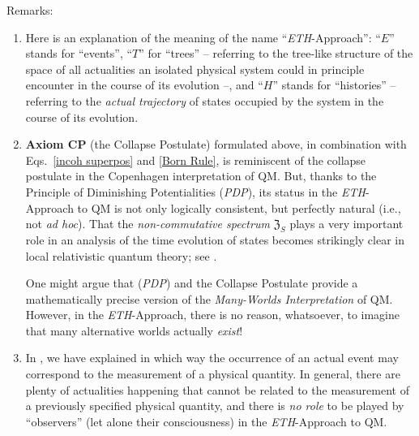\documentclass[12pt]{article}
\begin{document}
{Remarks}:
\begin{enumerate}
\item{Here is an explanation of the meaning of the name ``\textit{ETH}-Approach'': ``$E$'' stands for ``events'',
``$T$'' for ``trees'' -- referring to the tree-like structure of the space of all actualities an isolated physical system
could in principle encounter in the course of its evolution --, and ``$H$'' stands for ``histories'' --
referring to the \textit{actual trajectory} of states occupied by the system in the course of its evolution.}
\item{{\bf{Axiom CP}} (the Collapse Postulate) formulated above, in combination with Eqs.~\eqref{incoh superpos}
and \eqref{Born Rule}, is reminiscent of the collapse postulate in the Copenhagen interpretation of QM. But, thanks to the
Principle of Diminishing Potentialities (\textit{PDP}), its status in the \textit{ETH}-Approach to QM is not only logically consistent, but perfectly natural (i.e., not \textit{ad hoc}). That the \textit{non-commutative spectrum} $\mathfrak{Z}_S$ plays a very important role in an analysis of the time evolution of states becomes strikingly clear in local relativistic quantum theory; see \cite{Fr2}.

One might argue that  (\textit{PDP}) and the Collapse Postulate provide a mathematically precise version of the
\textit{Many-Worlds Interpretation} of QM. However, in the \textit{ETH}-Approach, there is no reason, whatsoever, to
imagine that many alternative worlds actually \textit{exist}!}
\item{In \cite{Fr1, Fr2}, we have explained in which way the occurrence of an actual event may correspond
to the measurement of a physical quantity. In general, there are plenty of actualities happening that cannot be related
to the measurement of a previously specified physical quantity, and there is \textit{no role} to be played by ``observers'' (let alone their consciousness) in the
\textit{ETH}-Approach to QM.

}
\end{enumerate}
\end{document}
